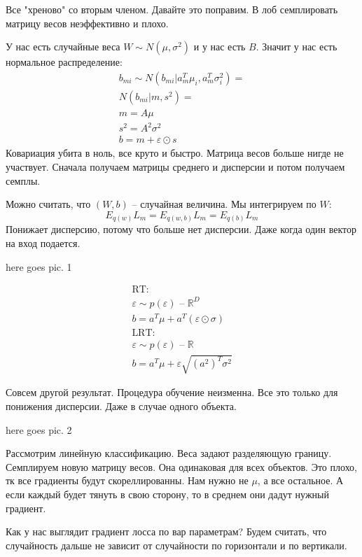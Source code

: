 \documentclass{minimal}
\begin{document}
Все "хреново" со вторым членом. Давайте это поправим.
В лоб семплировать матрицу весов неэффективно и плохо.

У нас есть случайные веса $W \sim N(\mu, \sigma^2)$ и у нас есть $B$. Значит у нас есть нормальное распределение:
 \begin{gather*}
   b_{mi} \sim N(b_{mi}|a_m^{T}\mu_i, a_m^T\sigma^2_i) =\\
    N(b_{mi}|m, s^2) =\\
    m = A\mu\\
    s^2=A^2\sigma^2\\
    b=m+\varepsilon \odot s
\end{gather*}
Ковариация убита в ноль, все круто и быстро. Матрица весов больше нигде не участвует. Сначала получаем матрицы среднего и дисперсии и потом получаем семплы.

Можно считать, что $(W, b)$ -- случайная величина. Мы интегрируем по  $W$:
\[
  E_{q(w)}L_m=E_{q(w,b)}L_m=E_{q(b)}L_m
\]
Понижает дисперсию, потому что больше нет дисперсии. Даже когда один вектор на вход подается.

here goes pic. 1

\begin{gather*}
  \textrm{RT:}\\
  \varepsilon \sim p(\varepsilon) \textrm{ -- } \mathbb{R}^D\\
  b = a^{T}\mu+a^{T}(\varepsilon \odot \sigma)\\
  \textrm{LRT:}\\
  \varepsilon \sim p(\varepsilon) \textrm{ -- } \mathbb{R}\\
  b = a^{T}\mu+\varepsilon \sqrt{(a^2)^T\sigma^2}
\end{gather*}

Совсем другой результат. Процедура обучение неизменна. Все это только для понижения дисперсии. Даже в случае одного объекта.

here goes pic. 2

Рассмотрим линейную классификацию. Веса задают разделяющую границу. Семплируем новую матрицу весов. Она одинаковая для всех объектов. Это плохо, тк все градиенты будут скореллированны. Нам нужно не $\mu$, а все остальное. А если каждый будет тянуть в свою сторону, то в среднем они дадут нужный градиент.

Как у нас выглядит градиент лосса по вар параметрам?
Будем считать, что случайность дальше не зависит от случайности по горизонтали и по вертикали.
\end{document}
